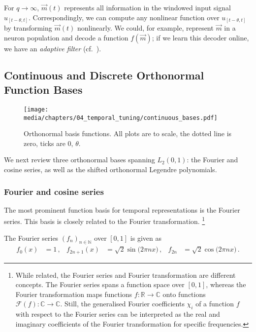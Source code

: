 For $q \to \infty$, $\vec m(t)$ represents all information in the windowed input signal $u_{[t - \theta, t]}$.
Correspondingly, we can compute any nonlinear function over $u_{[t - \theta, t]}$ by transforming $\vec m(t)$ nonlinearly.
We could, for example, represent $\vec m$ in a neuron population and decode a function $f(\vec m)$; if we learn this decoder online, we have an \emph{adaptive filter} (cf.~).

\subsection{Continuous and Discrete Orthonormal Function Bases}
\label{sec:function_bases}

\begin{figure}
	\texttt{[image: media/chapters/04\_temporal\_tuning/continuous\_bases.pdf]}%
	{\label{fig:fourier_series}}%
	{\label{fig:cosine_series}}%
	{\label{fig:legendre_series}}%
	\caption[Orthonormal basis functions]{
	Orthonormal basis functions. All plots are to scale, the dotted line is zero, ticks are $0$, $\theta$.}
\end{figure}

We next review three orthonormal bases spanning $L_2(0, 1)$: the Fourier and cosine series, as well as the shifted orthonormal Legendre polynomials.

\subsubsection{Fourier and cosine series}
The most prominent function basis for temporal representations is the Fourier series. This basis is closely related to the Fourier transformation.%
\footnote{While related, the Fourier series and Fourier transformation are different concepts.
The Fourier series spans a function space over $[0, 1]$, whereas the Fourier transformation maps functions $f : \mathbb{R} \longrightarrow \mathbb{C}$ onto functions $\mathcal{F}(f) : \mathbb{C} \longrightarrow \mathbb{C}$.
Still, the generalised Fourier coefficients $\chi_i$ of a function $f$ with respect to the Fourier series can be interpreted as the real and imaginary coefficients of the Fourier transformation for specific frequencies.}

\begin{definition}

The Fourier series $(f_n)_{n \in \mathbb{N}}$ over $[0, 1]$ is given as
\begin{align}
		f_0(x) &= 1 \,,&
		f_{2n + 1}(x) &= \sqrt{2}\sin\bigl(2 \pi nx\bigr) \,, &
		f_{2n} &= \sqrt{2}\cos\bigl(2 \pi nx\bigr) \,.
		\label{eqn:fourier_series}
	\end{align}
\end{definition}

